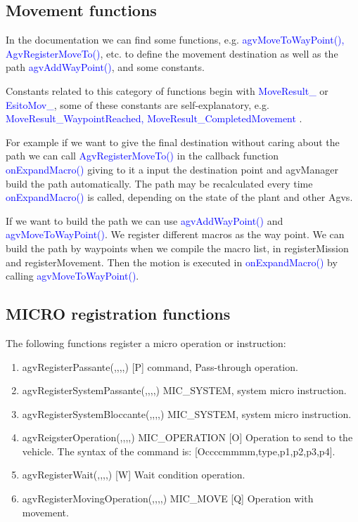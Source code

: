 %
\subsection{Movement functions}
In the documentation we can find some functions, e.g. \textcolor{blue}{agvMoveToWayPoint(), AgvRegisterMoveTo()}, etc. to define the movement destination as well as the path \textcolor{blue}{agvAddWayPoint()}, and some constants.

Constants related to this category of functions begin with \textcolor{blue}{MoveResult\_} or \textcolor{blue}{EsitoMov\_}, some of these constants are self-explanatory, e.g. \textcolor{blue}{MoveResult\_WaypointReached, MoveResult\_CompletedMovement }.

For example if we want to give the final destination without caring about the path we can call \textcolor{blue}{AgvRegisterMoveTo()} in the callback function \textcolor{blue}{onExpandMacro()} giving to it a input the destination point and agvManager build the path automatically. The path may be recalculated every time \textcolor{blue}{onExpandMacro()} is called, depending on the state of the plant and other Agvs.

If we want to build the path we can use \textcolor{blue}{agvAddWayPoint()} and \textcolor{blue}{agvMoveToWayPoint()}. We register different macros as the way point. We can build the path by waypoints when we compile the macro list, in registerMission and registerMovement. Then the motion is executed in \textcolor{blue}{onExpandMacro()} by calling \textcolor{blue}{agvMoveToWayPoint()}.

%
\subsection{MICRO registration functions}
The following functions register a micro operation or instruction:\\

\begin{enumerate}
	\item agvRegisterPassante(,,,,) [P] command, Pass-through operation.\\
	
	\item agvRegisterSystemPassante(,,,,) MIC\_SYSTEM, system micro instruction.
	\item agvRegisterSystemBloccante(,,,,) MIC\_SYSTEM, system micro instruction.\\
	
	\item agvReigsterOperation(,,,,) MIC\_OPERATION [O] Operation to send to the vehicle. The syntax of the command is: [Occccmmmm,type,p1,p2,p3,p4].\\
	
	\item agvRegisterWait(,,,,) [W] Wait condition operation.\\
	
	\item agvRegisterMovingOperation(,,,,) MIC\_MOVE [Q] Operation with movement.\\
\end{enumerate}

